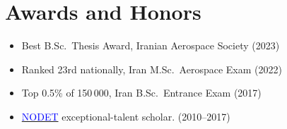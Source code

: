\documentclass[letterpaper,11pt]{article}
\makeatletter
\newcommand{\resumeItem}[1]{
  \item\small{
    {#1 \vspace{-2pt}}
  }
}
\newcommand{\resumeSubheading}[4]{
  \vspace{-2pt}\item
    \begin{tabular*}{1.0\textwidth}[t]{l@{\extracolsep{\fill}}r}
      \textbf{ #1} & \textbf{\small #2} \\
      \textsl{\small #3} & \textit{\small #4} \\
    \end{tabular*}\vspace{-7pt}
}
\newcommand{\resumeProjectHeading}[2]{
    \item
    \begin{tabular*}{1.001\textwidth}{l@{\extracolsep{\fill}}r}
      \small#1 & \textbf{\small #2}\\
    \end{tabular*}\vspace{-7pt}
}
\newcommand{\resumeSubHeadingListEnd}{\end{itemize}}
\newcommand{\resumeItemListStart}{\begin{itemize}}
\newcommand{\resumeItemListEnd}{\end{itemize}\vspace{-5pt}}
\makeatother
\begin{document}











 \section{Awards and Honors}

\begingroup
  \small
  \begin{multicols}{2}
    \begin{itemize}[itemsep=1pt, parsep=0pt, leftmargin=*]
      \item Best B.Sc.\ Thesis Award, Iranian Aerospace Society (2023)
      \item Ranked 23rd nationally, Iran M.Sc.\ Aerospace Exam (2022)
      \item Top 0.5\% of 150\,000, Iran B.Sc.\ Entrance Exam (2017)
      \item {\href{https://en.wikipedia.org/wiki/National_Organization_for_Development_of_Exceptional_Talents}{\textcolor{blue}{NODET}}} exceptional-talent scholar. (2010–2017)
    \end{itemize}
  \end{multicols}
\endgroup
\end{document}
